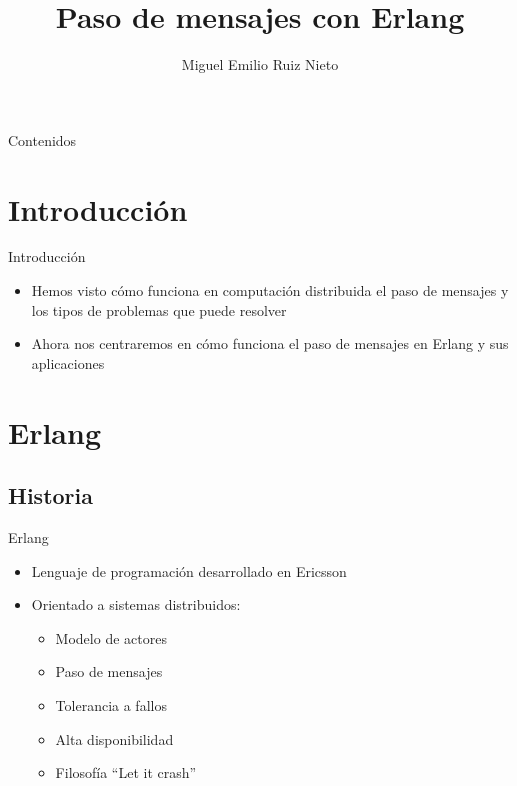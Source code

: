 \documentclass{beamer}
\title[CAP]{Paso de mensajes con Erlang}
\author[M. Ruiz (UCM)]{Miguel Emilio Ruiz Nieto}
\date{\mydate}
\begin{document}
  \begin{frame}
    \titlepage
  \end{frame}

  \begin{frame}{Contenidos}
    \tableofcontents[hideallsubsections]
  \end{frame}

  \section{Introducción}
  \begin{frame}{Introducción}
    \begin{itemize}
      \item Hemos visto cómo funciona en computación distribuida el paso de
      mensajes y los tipos de problemas que puede resolver
      \item Ahora nos centraremos en cómo funciona el paso de mensajes en Erlang
      y sus aplicaciones
    \end{itemize}
  \end{frame}

  \section{Erlang}
    \subsection{Historia}
      \begin{frame}{Erlang}
        \begin{itemize}
          \item Lenguaje de programación desarrollado en Ericsson
          \item Orientado a sistemas distribuidos:
          \begin{itemize}
            \item Modelo de actores
            \item Paso de mensajes
            \item Tolerancia a fallos
            \item Alta disponibilidad
            \item Filosofía ``Let it crash''
          \end{itemize}
        \end{itemize}
      \end{frame}
\end{document}
